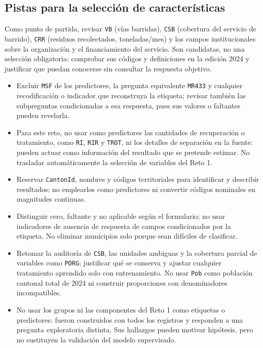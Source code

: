 \documentclass[a4,11pt]{aleph-notas}
\begin{document}
\subsection*{Pistas para la selección de características}
Como punto de partida, revisar \texttt{VB} (vías barridas), \texttt{CSB} (cobertura del servicio de barrido), \texttt{CRR} (residuos recolectados, toneladas/mes) y los campos institucionales sobre la organización y el financiamiento del servicio. Son candidatas, no una selección obligatoria: comprobar sus códigos y definiciones en la edición 2024 y justificar que puedan conocerse sin consultar la respuesta objetivo.
\begin{itemize}[leftmargin=*]
    \item Excluir \texttt{MSF} de los predictores, la pregunta equivalente \texttt{MR433} y cualquier recodificación o indicador que reconstruya la etiqueta; revisar también las subpreguntas condicionadas a esa respuesta, pues sus valores o faltantes pueden revelarla.
    \item Para este reto, no usar como predictores las cantidades de recuperación o tratamiento, como \texttt{RI}, \texttt{RIR} y \texttt{TROT}, ni los detalles de separación en la fuente: pueden actuar como información del resultado que se pretende estimar. No trasladar automáticamente la selección de variables del Reto 1.
    \item Reservar \texttt{CantonId}, nombres y códigos territoriales para identificar y describir resultados; no emplearlos como predictores ni convertir códigos nominales en magnitudes continuas.
    \item Distinguir cero, faltante y no aplicable según el formulario; no usar indicadores de ausencia de respuesta de campos condicionados por la etiqueta. No eliminar municipios solo porque sean difíciles de clasificar.
    \item Retomar la auditoría de \texttt{CSB}, las unidades ambiguas y la cobertura parcial de variables como \texttt{PORG}; justificar qué se conserva y ajustar cualquier tratamiento aprendido solo con entrenamiento. No usar \texttt{Pob} como población cantonal total de 2024 ni construir proporciones con denominadores incompatibles.
    \item No usar los grupos ni las componentes del Reto 1 como etiquetas o predictores: fueron construidos con todos los registros y responden a una pregunta exploratoria distinta. Sus hallazgos pueden motivar hipótesis, pero no sustituyen la validación del modelo supervisado.
\end{itemize}
\end{document}
